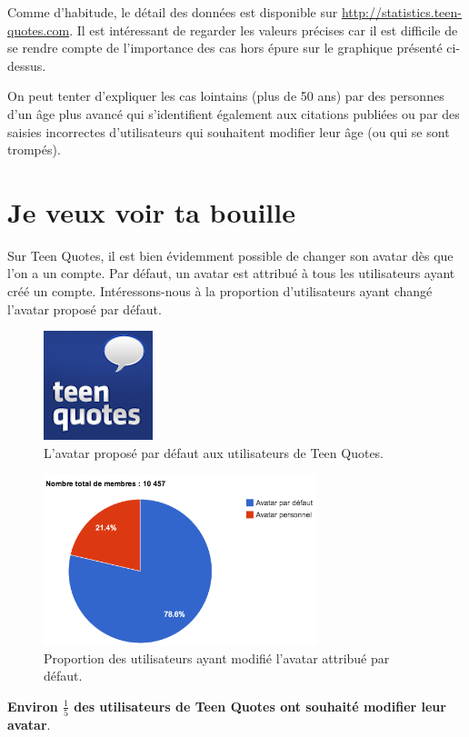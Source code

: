 \documentclass{report}
\begin{document}
	Comme d'habitude, le détail des données est disponible sur \url{http://statistics.teen-quotes.com}. Il est intéressant de regarder les valeurs précises car il est difficile de se rendre compte de l'importance des cas hors épure sur le graphique présenté ci-dessus.

	On peut tenter d'expliquer les cas lointains (plus de 50 ans) par des personnes d'un âge plus avancé qui s'identifient également aux citations publiées ou par des saisies incorrectes d'utilisateurs qui souhaitent modifier leur âge (ou qui se sont trompés).

	\section{Je veux voir ta bouille}
	Sur Teen Quotes, il est bien évidemment possible de changer son avatar dès que l'on a un compte. Par défaut, un avatar est attribué à tous les utilisateurs ayant créé un compte. Intéressons-nous à la proportion d'utilisateurs ayant changé l'avatar proposé par défaut.
	\begin{figure}[H]
		\center
		\includegraphics{images/avatarDefaut.png}
		\caption{L'avatar proposé par défaut aux utilisateurs de Teen Quotes.}
	\end{figure}

	\begin{figure}[H]
		\center
		\includegraphics[width=300px]{images/partAvatar.png}
		\caption{Proportion des utilisateurs ayant modifié l'avatar attribué par défaut.}
	\end{figure}
	\textbf{Environ $\frac{1}{5}$ des utilisateurs de Teen Quotes ont souhaité modifier leur avatar}.
\end{document}
